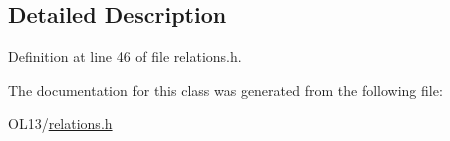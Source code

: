 \subsection{Detailed Description}


Definition at line 46 of file relations.\+h.



The documentation for this class was generated from the following file\+:\begin{DoxyCompactItemize}
\item 
O\+L13/\hyperlink{relations_8h}{relations.\+h}\end{DoxyCompactItemize}
